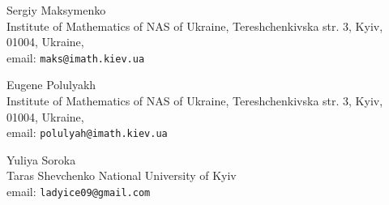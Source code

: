 \documentclass[12pt, reqno]{amsart}
\begin{document}
\bigskip

\begin{flushleft}
{\sc Sergiy Maksymenko} \\
Institute of Mathematics of NAS of Ukraine, Tereshchenkivska str. 3, Kyiv, 01004, Ukraine, \\
email: \texttt{maks@imath.kiev.ua}   

\bigskip

{\sc Eugene Polulyakh} \\
Institute of Mathematics of NAS of Ukraine, Tereshchenkivska str. 3, Kyiv, 01004, Ukraine, \\
email: \texttt{polulyah@imath.kiev.ua} 

\bigskip


{\sc Yuliya Soroka} \\
Taras Shevchenko National University of Kyiv \\
email: \texttt{ladyice09@gmail.com}
\end{flushleft}
\end{document}
